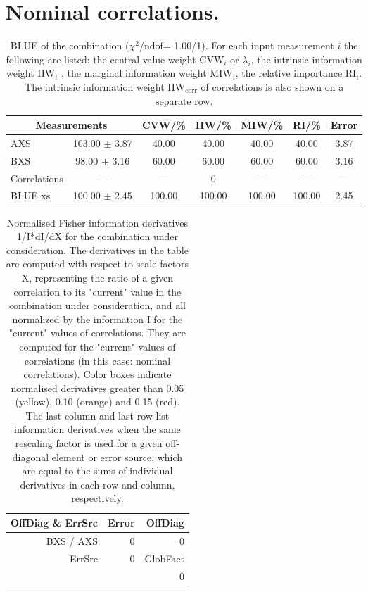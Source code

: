\section{Nominal correlations.}
\begin{table}[H]
\scriptsize
\begin{center}
\renewcommand{\arraystretch}{1.1}
\begin{tabular}{|lc|c|c|c|c|c|}
\hline
\multicolumn{2}{|c|}{Measurements} & CVW/\%  & IIW/\%  & MIW/\%  & RI/\%  & {\tiny Error}\\
\hline
AXS &     103.00 $\pm$       3.87 &      40.00 &      40.00 &      40.00 &      40.00 &       3.87\\
BXS &      98.00 $\pm$       3.16 &      60.00 &      60.00 &      60.00 &      60.00 &       3.16\\
Correlations & --- & --- &  0 & --- & --- & ---\\
\hline
BLUE {\tiny xs} &     100.00 $\pm$       2.45 &     100.00 &     100.00 &     100.00 &     100.00 &       2.45\\
\hline
\end{tabular}
\caption{BLUE of the combination ($\chi^2$/ndof=      1.00/1).
 For each input measurement $i$ the following are listed: the central value weight CVW$_i$ or $\lambda_i$, the intrinsic information weight IIW$_i$ , the marginal information weight MIW$_i$, the relative importance RI$_i$. The intrinsic information weight IIW$_{\mathrm{corr}}$ of correlations is also shown on a separate row.}
\renewcommand{\arraystretch}{1}
\end{center}
\end{table}
\begin{table}[H]
\scriptsize
\begin{center}
\renewcommand{\arraystretch}{1.1}
\begin{tabular}{|r|r|r|}
\hline
 OffDiag \& ErrSrc & {\tiny Error} & OffDiag\\
\hline
BXS / AXS &  0 &  0 \\
\hline
\multirow{2}{*}{ErrSrc} & \multirow{2}{*}{ 0} & GlobFact\\
 & &  0 \\
\hline
\end{tabular}
\renewcommand{\arraystretch}{1}
\caption{Normalised Fisher information derivatives 1/I*dI/dX for the combination under consideration. The derivatives in the table are computed with respect to scale factors X, representing the ratio of a given correlation to its "current" value in the combination under consideration, and all normalized by the information I for the "current" values of correlations. They are computed for the "current" values of correlations (in this case: nominal correlations). Color boxes indicate normalised derivatives greater than 0.05 (yellow), 0.10 (orange) and 0.15 (red). The last column and last row list information derivatives when the same rescaling factor is used for a given off-diagonal element or error source, which are equal to the sums of individual derivatives in each row and column, respectively.}
\end{center}
\end{table}
